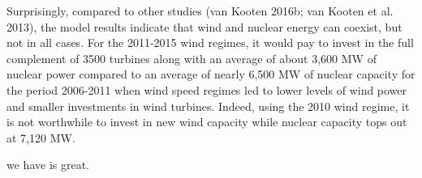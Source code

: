Surprisingly, compared to other studies (van Kooten 2016b; van Kooten et al. 2013), the model results indicate that wind and nuclear energy can coexist, but not in all cases. For the 2011-2015 wind regimes, it would pay to invest in the full complement of 3500 turbines along with an average of about 3,600 MW of nuclear power compared to an average of nearly 6,500 MW of nuclear capacity for the period 2006-2011 when wind speed regimes led to lower levels of wind power and smaller investments in wind turbines. Indeed, using the 2010 wind regime, it is not worthwhile to invest in new wind capacity while nuclear capacity tops out at 7,120 MW.






 we have \citep{Officer1996} is great.